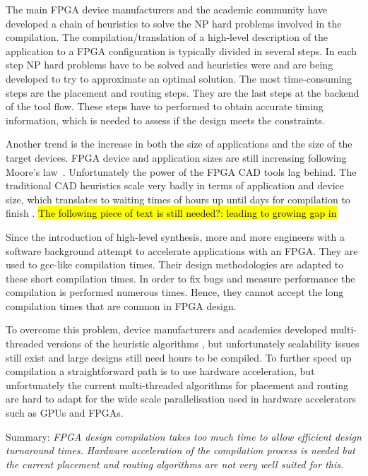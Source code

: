 \documentclass[a4paper,oneside,12pt]{article}
\begin{document}
The main FPGA device manufacturers and the academic community have developed a chain of heuristics to solve the NP hard problems involved in the compilation.
The compilation/translation of a high-level description of the application to a FPGA configuration is typically divided in several steps. In each step NP hard problems have to be solved and heuristics were and are being developed to try to approximate an optimal solution. The most time-consuming steps are the placement and routing steps. They are the last steps at the backend of the tool flow. These steps have to performed to obtain accurate timing information, which is needed to assess if the design meets the constraints. 
 
Another trend is the increase in both the size of applications and the size of the target devices. FPGA device and application sizes are still increasing following Moore's law~\cite{shannon2015technology}. Unfortunately the power of the FPGA CAD tools lag behind. The traditional CAD heuristics scale very badly in terms of application and device size, which translates to waiting times of hours up until days for compilation to finish \cite{murray2015timing}. 
\hl{The following piece of text is still needed?: leading to growing gap in }

Since the introduction of high-level synthesis\cite{}, more and more engineers with a software background attempt to accelerate applications with an FPGA. They are used to gcc-like compilation times. Their design methodologies are adapted to these short compilation times. In order to fix bugs and measure performance the compilation is performed numerous times. Hence, they cannot accept the long compilation times that are common in FPGA design.

To overcome this problem, device manufacturers and academics developed multi-threaded versions of the heuristic algorithms \cite{ludwin2011,gort2012,betz2013method,jain2014multi}, but unfortunately scalability issues still exist and large designs still need hours to be compiled. To further speed up compilation a straightforward path is to use hardware acceleration, but unfortunately the current multi-threaded algorithms for placement and routing are hard to adapt for the wide scale parallelisation used in hardware accelerators such as GPUs and FPGAs.

Summary: \emph{FPGA design compilation takes too much time to allow efficient design turnaround times. Hardware acceleration of the compilation process is needed but the current placement and routing algorithms are not very well suited for this.
} 
\end{document}
